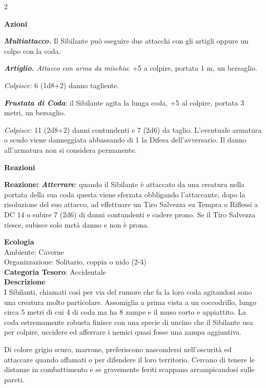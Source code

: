 \begin{multicols}{2}
{\textbf{Azioni}

\emph{\textbf{Multiattacco.}} Il Sibilante può eseguire due attacchi con gli artigli oppure un colpo con la coda.

\emph{\textbf{Artiglio.} Attacco con arma da mischia}: +5 a colpire, portata 1 m, un bersaglio.

\emph{Colpisce:} 6 (1d8+2) danno tagliente.

\emph{\textbf{Frustata di Coda}}: il Sibilante agita la lunga coda, +5 al colpire, portata 3 metri, un bersaglio.

\emph{Colpisce:} 11 (2d8+2) danni contundenti e 7 (2d6) da taglio. L'eventuale armatura o scudo viene danneggiata abbassando di 1 la Difesa dell'avversario. Il danno all'armatura non si considera permanente.

\textbf{Reazioni}

\textbf{Reazione: \emph{Atterrare}}: quando il Sibilante è attaccato da una creatura nella portata della sua coda questa viene sferzata obbligando l'attaccante, dopo la risoluzione del suo attacco, ad effettuare un Tiro Salvezza su Tempra o Riflessi a DC 14 o subire 7 (2d6) di danni contundenti e cadere prono. Se il Tiro Salvezza riesce, subisce solo metà danno e non è prona.

\textbf{Ecologia}\\
Ambiente: Caverne\\
Organizzazione: Solitario, coppia o nido (2-4)\\
\textbf{Categoria Tesoro}: Accidentale\\
\textbf{Descrizione}\\
I Sibilanti, chiamati così per via del rumore che fa la loro coda agitandosi sono una creatura molto particolare. Assomiglia a prima vista a un coccodrillo, lungo circa 5 metri di cui 4 di coda ma ha 8 zampe e il muso corto e appiattito. La coda estremamente robusta finisce con una specie di uncino che il Sibilante usa per colpire, uccidere ed afferrare i nemici quasi fosse una zampa aggiuntiva.

Di colore grigio scuro, marrone, preferiscono nascondersi nell'oscurità ed attaccare quando affamati o per difendere il loro territorio. Cercano di tenere le distanze in combattimento e se gravemente feriti scappano arrampicandosi sulle pareti.

}
\end{multicols}
